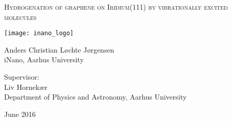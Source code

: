
\begin{titlingpage}

\begin{center}

\vspace*{0cm}
\huge
\textsc{Hydrogenation of graphene on Iridium(111) by vibrationally excited molecules}\\
\vspace{1.5cm}

\vspace{3cm}
\texttt{[image: inano\_logo]}
\vspace{4cm}

\large
{
    Anders Christian Løchte Jørgensen\\
    iNano, Aarhus University
}

\vspace{1.5cm}

{
  Supervisor:\\
  Liv Hornekær\\
  Department of Physics and Astronomy, Aarhus University
}

\vspace{1.5cm}
{June 2016}\\


\end{center}



\end{titlingpage}

